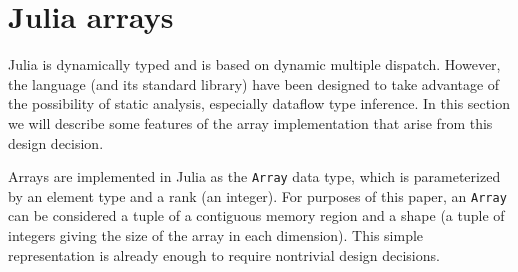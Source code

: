 \documentclass[preprint]{sigplanconf}
\newcommand{\code}[1]{\texttt{#1}}
\begin{document}


\section{Julia arrays}

Julia is dynamically typed and is based on dynamic multiple dispatch.
However, the language (and its standard library) have been designed to
take advantage of the possibility of static analysis, especially
dataflow type inference. In this section we will describe some features
of the array implementation that arise from this design decision.

Arrays are implemented in Julia\cite{Bezanson:2012jf} as the \code{Array}
data type, which is parameterized by an element type and a rank (an integer).
For purposes of this paper, an \code{Array} can be considered a tuple of
a contiguous memory region and a shape (a tuple of integers giving the size
of the array in each dimension). This simple representation is already
enough to require nontrivial design decisions.

\end{document}
